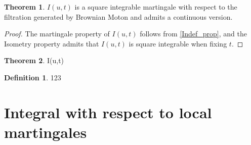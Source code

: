 \documentclass[12pt]{book}
\theoremstyle{definition}
\newtheorem{definition}{Definition}[chapter]
\newtheorem{theorem}{Theorem}[chapter]
\begin{document}
\begin{theorem}
	$I(u,t)$ is a square integrable martingale with respect to the filtration generated by Brownian Moton and admits a continuous version.
\end{theorem}

\begin{proof}
The martingale property of $I(u,t)$ follows from \ref{Indef_prop}, and the Isometry property admits that $I(u,t)$ is square integrable when fixing $t$.
\end{proof}



\begin{theorem}
	I(u,t) 
\end{theorem}

\begin{definition}
123	
\end{definition}

\section{Integral with respect to local martingales}
\end{document}

